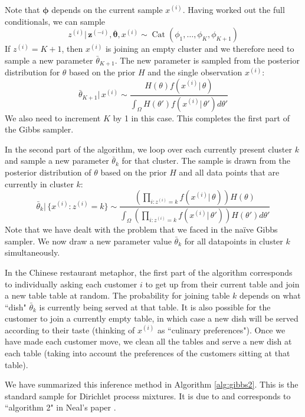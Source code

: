 \documentclass[final,3p,times,twocolumn]{elsarticle}
\DeclareMathOperator*{\Cat}{Cat}
\let\bs\boldsymbol
\begin{document}
Note that $\bs \phi$ depends on the current sample $x^{(i)}$.
Having worked out the full conditionals, we can sample 
\begin{equation}
\label{eqn:samplez}
z^{(i)}|\,\bs z^{(-i)},\overline {\bs \theta},x^{(i)} \sim \Cat(\phi_1,\dots,\phi_K,\phi_{K+1})
\end{equation}
If $z^{(i)}=K+1$, then $x^{(i)}$ is joining an empty cluster and we therefore need to sample a new parameter $\bar \theta_{K+1}$.
The new parameter is sampled from the posterior distribution for $\theta$ based on the prior $H$ and the single observation $x^{(i)}$:
\begin{equation}
\label{eqn:newcluster}
\bar \theta_{K+1}|\,x^{(i)} \sim \frac{H(\theta)f(x^{(i)}|\,\theta)}{\int_\Omega H(\theta')f(x^{(i)}|\,\theta')d\theta'}
\end{equation}
We also need to increment $K$ by 1 in this case.
This completes the first part of the Gibbs sampler.

In the second part of the algorithm, we loop over each currently present cluster $k$ and sample a new parameter $\bar \theta_k$ for that cluster.
The sample is drawn from the posterior distribution of $\theta$ based on the prior $H$ and all data points that are currently in cluster $k$:
\begin{equation}
\label{eqn:sampletheta}
\bar \theta_k |\,\{x^{(i)}:z^{(i)}=k\} \sim \frac{\left(\prod_{i:z^{(i)}=k}f(x^{(i)}|\,\theta)\right)H(\theta)}{\int_\Omega\left(\prod_{i:z^{(i)}=k}f(x^{(i)}|\,\theta')\right)H(\theta')d\theta'}
\end{equation}
Note that we have dealt with the problem that we faced in the na{\"i}ve Gibbs sampler.
We now draw a new parameter value $\bar \theta_k$ for all datapoints in cluster $k$ simultaneously.

In the Chinese restaurant metaphor, the first part of the algorithm corresponds to individually asking each customer $i$ to get up from their current table and join a new table table at random.
The probability for joining table $k$ depends on what ``dish" $\bar \theta_k$ is currently being served at that table. It is also possible for the customer to join a currently empty table, in which case a new dish will be served according to their taste (thinking of $x^{(i)}$ as ``culinary preferences").
Once we have made each customer move, we clean all the tables and serve a new dish at each table (taking into account the preferences of the customers sitting at that table).

We have summarized this inference method in Algorithm \ref{alg:gibbs2}.
This is the standard sample for Dirichlet process mixtures.
It is due to \cite{maceachern1994} and corresponds to ``algorithm 2" in Neal's paper \cite{neal2000}.
\end{document}
